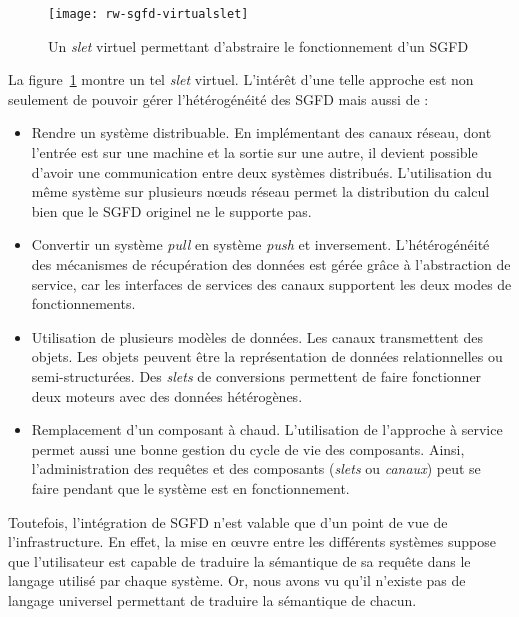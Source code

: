 \begin{figure}[ht]
    \centering
    \texttt{[image: rw-sgfd-virtualslet]}
    \caption{Un \textit{slet} virtuel permettant d'abstraire le fonctionnement d'un SGFD}\label{fig:rw:sgfd:virtualslet}
\end{figure}
La figure~\ref{fig:rw:sgfd:virtualslet} montre un tel \textit{slet} virtuel. L'intérêt d'une telle approche est non seulement de pouvoir gérer l'hétérogénéité des SGFD mais aussi de :
\begin{itemize}
	\item Rendre un système distribuable. En implémentant des canaux réseau, dont l'entrée est sur une machine et la sortie sur une autre, il devient possible d'avoir une communication entre deux systèmes distribués. L'utilisation du même système sur plusieurs nœuds réseau permet la distribution du calcul bien que le SGFD originel ne le supporte pas.
	\item Convertir un système \textit{pull} en système \textit{push} et inversement. L'hétérogénéité des mécanismes de récupération des données est gérée grâce à l'abstraction de service, car les interfaces de services des canaux supportent les deux modes de fonctionnements.
	\item Utilisation de plusieurs modèles de données. Les canaux transmettent des objets. Les objets peuvent être la représentation de données relationnelles ou semi-structurées. Des \textit{slets} de conversions permettent de faire fonctionner deux moteurs avec des données hétérogènes.
	\item Remplacement d'un composant à chaud. L'utilisation de l'approche à service permet aussi une bonne gestion du cycle de vie des composants. Ainsi, l'administration des requêtes et des composants (\textit{slets} ou \textit{canaux}) peut se faire pendant que le système est en fonctionnement.
\end{itemize}

Toutefois, l'intégration de SGFD n'est valable que d'un point de vue de l’infrastructure. En effet, la mise en œuvre entre les différents systèmes suppose que l'utilisateur est capable de traduire la sémantique de sa requête dans le langage utilisé par chaque système. Or, nous avons vu qu'il n'existe pas de langage universel permettant de traduire la sémantique de chacun.

